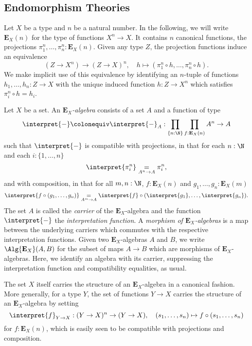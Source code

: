 {
\newcommand{\EE}{\mathbf{E}}
\newcommand{\ev}{\operatorname{\mathrm{ev}}}

\subsection{Endomorphism Theories}
Let \(X\) be a type and \(n\) be a natural number.
In the following, we will write \(\EE_X(n)\) for the type of functions \(X^n\to X\).
It contains \(n\) canonical functions, the projections \(\pi^n_1,\dots,\pi^n_n : \EE_X(n)\).
Given any type \(Z\), the projection functions induce an equivalence
\[
  (Z \to X^n) \to (Z\to X)^n, \quad h \mapsto (\pi^n_1\circ h,\dots,\pi^n_n\circ h).
\]
We make implicit use of this equivalence by identifying an \(n\)-tuple of functions \(h_1,\dots,h_n:Z\to X\) with the unique induced function \(h : Z\to X^n\) which satisfies \(\pi^n_i \circ h = h_i\).

\begin{definition}
  Let \(X\) be a set.
  An \emph{\(\EE_X\)-algebra} consists of a set \(A\) and a function of type
  \[
    \interpret{-}\colonequiv\interpret{-}_A : \prod_{\{n:\N\}}\prod_{f:\EE_X(n)} A^n \to A
  \]
  such that \(\interpret{-}\) is compatible with projections, in that
  for each \(n:\N\) and each \(i : \{1,\dots,n\}\)
  \[\interpret{\pi^n_i} \underset{A^n \to A}{=} \pi^n_i,\]
  and with composition, in that for all \(m,n:\N\), \(f:\EE_X(n)\) and \(g_1,\dots,g_n : \EE_X(m)\)
  \[\interpret{f\circ (g_1,\dots,g_n)} \underset{A^m \to A}{=} \interpret{f}\circ (\interpret{g_1},\dots,\interpret{g_n}).\]
  The set \(A\) is called the \emph{carrier} of the \(\EE_X\)-algebra and the function \(\interpret{-}\) the \emph{interpretation function}.
  A \emph{morphism of \(\EE_X\)-algebras} is a map between the underlying carriers which commutes with the respective interpretation functions.
  Given two \(\EE_X\)-algebras \(A\) and \(B\), we write \(\Alg{\EE_X}(A,B)\) for the subset of maps \(A\to B\) which are morphisms of \(\EE_X\)-algebras.
  Here, we identify an algebra with its carrier, suppressing the interpretation function and compatibility equalities, as usual.
\end{definition}

\begin{example}
  The set \(X\) itself carries the structure of an \(\EE_X\)-algebra in a canonical fashion.
  More generally, for a type \(Y\), the set of functions \(Y \to X\) carries the structure of an \(\EE_X\)-algebra by setting
  \[\interpret{f}_{Y\to X} : (Y\to X)^n \to (Y\to X), \quad (s_1,\dots,s_n) \mapsto f\circ (s_1,\dots,s_n)\]
  for \(f:\EE_X(n)\), which is easily seen to be compatible with projections and composition.
\end{example}

}

